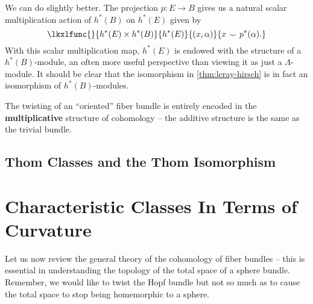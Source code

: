 We can do slightly better. The projection $p : E \to B$ gives us a natural scalar multiplication action of $h^*(B)$ on $h^*(E)$ given by
\[
	\lkxlfunc{}{h^*(E)\times h^*(B)}{h^*(E)}{(x, \alpha)}{x\smile p^*(\alpha).}
\]
With this scalar multiplication map, $h^*(E)$ is endowed with the structure of a $h^*(B)$-module, an often more useful perspective than viewing it as just a $\Lambda$-module. It should be clear that the isomorphism in \cref{thm:leray-hirsch} is in fact an isomorphism of $h^*(B)$-modules.


\begin{insight}
	The twisting of an ``oriented'' fiber bundle is entirely encoded in the \textbf{multiplicative} structure of cohomology -- the additive structure is the same as the trivial bundle.
\end{insight}

\subsection{Thom Classes and the Thom Isomorphism}

\section{Characteristic Classes In Terms of Curvature}



Let us now review the general theory of the cohomology of fiber bundles -- this is essential in understanding the topology of the total space of a sphere bundle. Remember, we would like to twist the Hopf bundle but not so much as to cause the total space to stop being homemorphic to a sphere.


